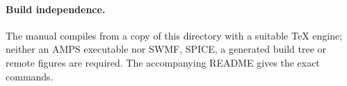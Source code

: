 \documentclass[11pt,oneside,openany]{book}
\begin{document}
\paragraph{Build independence.}
The manual compiles from a copy of this directory with a suitable TeX engine;
neither an AMPS executable nor SWMF, SPICE, a generated build tree or remote
figures are required. The accompanying README gives the exact commands.
\tableofcontents
\listoftables
\mainmatter




















\appendix



\backmatter

\end{document}
